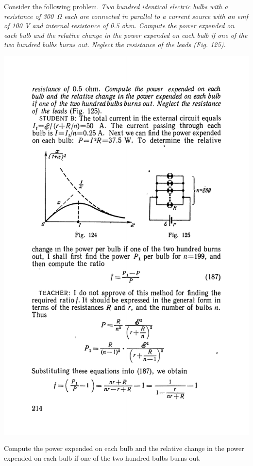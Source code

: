 \documentclass[a4paper,sfsidenotes]{tufte-book}
\begin{document}
Consider the following problem. \emph{Two hundred identical electric bulbs with a resistance of \SI{300}{\ohm} each are connected in parallel to a current source with an emf of 100 V and internal resistance of 0.5 ohm. Compute the power expended on each bulb and the relative change in the power expended on each bulb if one of the two hundred bulbs burns out. Neglect the resistance of the leads (Fig. 125).}
\\
\begin{marginfigure}%
\centering
\includegraphics[width=\linewidth]{fig-125a}
\caption{Compute the power expended on each bulb and the relative change in the power expended on each bulb if one of the two hundred bulbs burns out.}
\label{fig-125}
\end{marginfigure}
\end{document}
